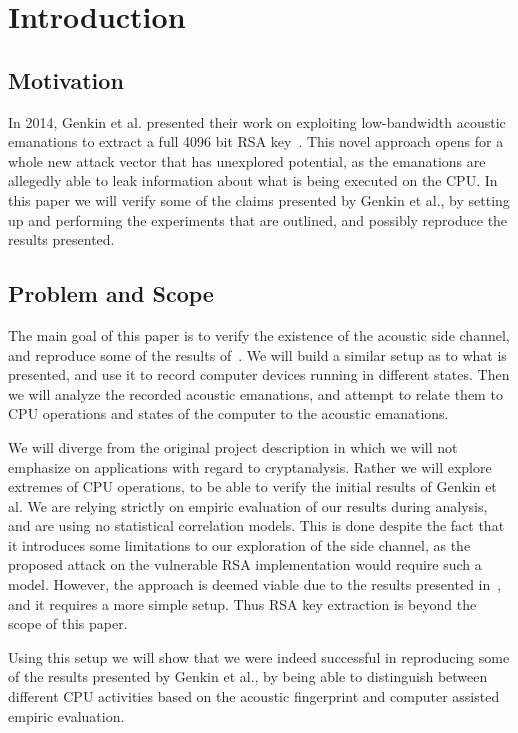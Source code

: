 \chapter{Introduction}\label{chp:introduction} 

\section{Motivation}
In 2014, Genkin et al. presented their work on exploiting low-bandwidth acoustic emanations to extract a full 4096 bit RSA key~\cite{DBLP:conf/crypto/GenkinST14}.
This novel approach opens for a whole new attack vector that has unexplored potential, as the emanations are allegedly able to leak information about what is being executed on the CPU.
In this paper we will verify some of the claims presented by Genkin et al., by setting up and performing the experiments that are outlined, and possibly reproduce the results presented.


\section{Problem and Scope}
The main goal of this paper is to verify the existence of the acoustic side channel, and reproduce some of the results of~\cite{DBLP:conf/crypto/GenkinST14}.
We will build a similar setup as to what is presented, and use it to record computer devices running in different states.
Then we will analyze the recorded acoustic emanations, and attempt to relate them to CPU operations and states of the computer to the acoustic emanations.

We will diverge from the original project description in which we will not emphasize on applications with regard to cryptanalysis.
Rather we will explore extremes of CPU operations, to be able to verify the initial results of Genkin et al.
We are relying strictly on empiric evaluation of our results during analysis, and are using no statistical correlation models.
This is done despite the fact that it introduces some limitations to our exploration of the side channel, as the proposed attack on the vulnerable RSA implementation would require such a model.
However, the approach is deemed viable due to the results presented in~\cite{DBLP:conf/crypto/GenkinST14}, and it requires a more simple setup.
Thus RSA key extraction is beyond the scope of this paper.

Using this setup we will show that we were indeed successful in reproducing some of the results presented by Genkin et al., by being able to distinguish between different CPU activities based on the acoustic fingerprint and computer assisted empiric evaluation.

